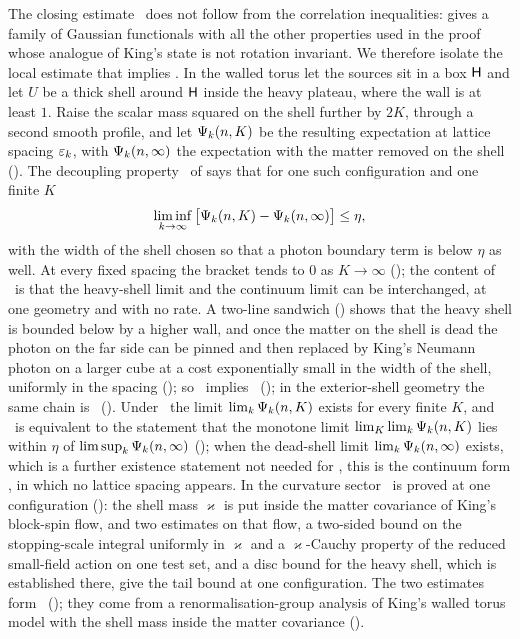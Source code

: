 The closing estimate \TIz\ does not follow from the correlation inequalities:  gives a family of Gaussian functionals with all the other properties used in the proof whose analogue of King's state is not rotation invariant. We therefore isolate the local estimate that implies \TIz. In the walled torus let the sources sit in a box $\mathsf H$ and let $U$ be a thick shell around $\mathsf H$ inside the heavy plateau, where the wall is at least $1$. Raise the scalar mass squared on the shell further by $2K$, through a second smooth profile, and let $\Psi_k(n,K)$ be the resulting expectation at lattice spacing $\varepsilon_k$, with $\Psi_k(n,\infty)$ the expectation with the matter removed on the shell (). The decoupling property \REz\ of  says that for one such configuration and one finite $K$
\[
\liminf_{k\to\infty}\big[\Psi_k(n,K)-\Psi_k(n,\infty)\big]\le\eta ,
\]
with the width of the shell chosen so that a photon boundary term is below $\eta$ as well. At every fixed spacing the bracket tends to $0$ as $K\to\infty$ (); the content of \REz\ is that the heavy-shell limit and the continuum limit can be interchanged, at one geometry and with no rate. A two-line sandwich () shows that the heavy shell is bounded below by a higher wall, and once the matter on the shell is dead the photon on the far side can be pinned and then replaced by King's Neumann photon on a larger cube at a cost exponentially small in the width of the shell, uniformly in the spacing (); so \REz\ implies \TIz\ (); in the exterior-shell geometry the same chain is \DSh\ (). Under \Kz\ the limit $\lim_k\Psi_k(n,K)$ exists for every finite $K$, and \REz\ is equivalent to the statement that the monotone limit $\lim_K\lim_k\Psi_k(n,K)$ lies within $\eta$ of $\limsup_k\Psi_k(n,\infty)$ (); when the dead-shell limit $\lim_k\Psi_k(n,\infty)$ exists, which is a further existence statement not needed for \REz, this is the continuum form \REcont, in which no lattice spacing appears. In the curvature sector \REz\ is proved at one configuration (): the shell mass $\varkappa$ is put inside the matter covariance of King's block-spin flow, and two estimates on that flow, a two-sided bound on the stopping-scale integral uniformly in $\varkappa$ and a $\varkappa$-Cauchy property of the reduced small-field action on one test set, and a disc bound for the heavy shell, which is established there, give the tail bound at one configuration. The two estimates form \HS\ (); they come from a renormalisation-group analysis of King's walled torus model with the shell mass inside the matter covariance ().

